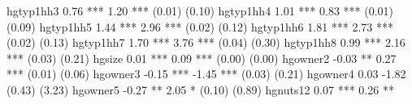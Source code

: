 hgtyp1hh3                                                                                    0.76 ***       1.20 ***
                                                                                            (0.01)         (0.10)   
hgtyp1hh4                                                                                    1.01 ***       0.83 ***
                                                                                            (0.01)         (0.09)   
hgtyp1hh5                                                                                    1.44 ***       2.96 ***
                                                                                            (0.02)         (0.12)   
hgtyp1hh6                                                                                    1.81 ***       2.73 ***
                                                                                            (0.02)         (0.13)   
hgtyp1hh7                                                                                    1.70 ***       3.76 ***
                                                                                            (0.04)         (0.30)   
hgtyp1hh8                                                                                    0.99 ***       2.16 ***
                                                                                            (0.03)         (0.21)   
hgsize                                                                                       0.01 ***       0.09 ***
                                                                                            (0.00)         (0.00)   
hgowner2                                                                                    -0.03 **        0.27 ***
                                                                                            (0.01)         (0.06)   
hgowner3                                                                                    -0.15 ***      -1.45 ***
                                                                                            (0.03)         (0.21)   
hgowner4                                                                                     0.03          -1.82    
                                                                                            (0.43)         (3.23)   
hgowner5                                                                                    -0.27 **        2.05 *  
                                                                                            (0.10)         (0.89)   
hgnuts12                                                                                     0.07 ***       0.26 ** 
